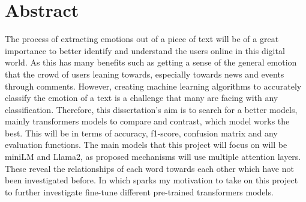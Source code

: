 
\chapter*{Abstract}

The process of extracting emotions out of a piece of text will be of a great importance to better identify and
understand the users online in this digital world. 
As this has many benefits such as getting a sense of the general emotion that the crowd of users leaning towards, 
especially towards news and events through comments.
However, creating machine learning algorithms to accurately classify the emotion of a text is a challenge that
many are facing with any classification.
Therefore, this dissertation's aim is to search for a better models, mainly transformers models to compare and contrast,
which model works the best.
This will be in terms of accuracy, f1-score, confusion matrix and any evaluation functions.
The main models that this project will focus on will be miniLM and Llama2, 
as proposed mechanisms will use multiple attention layers. 
These reveal the relationships of each word towards each other which have not been investigated before.
In which sparks my motivation to take on this project to further investigate fine-tune different pre-trained transformers
models.